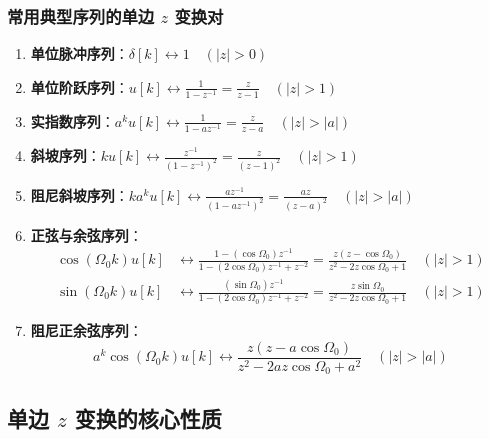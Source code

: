 \documentclass[11pt,a4paper,fontset=fandol]{ctexart}
\theoremstyle{remark}
\begin{document}
\subsubsection{常用典型序列的单边 $z$ 变换对}
\begin{enumerate}
    \item \textbf{单位脉冲序列}：$\delta[k] \longleftrightarrow 1 \quad (|z| > 0)$
    \item \textbf{单位阶跃序列}：$u[k] \longleftrightarrow \frac{1}{1 - z^{-1}} = \frac{z}{z - 1} \quad (|z| > 1)$
    \item \textbf{实指数序列}：$a^k u[k] \longleftrightarrow \frac{1}{1 - a z^{-1}} = \frac{z}{z - a} \quad (|z| > |a|)$
    \item \textbf{斜坡序列}：$k u[k] \longleftrightarrow \frac{z^{-1}}{(1 - z^{-1})^2} = \frac{z}{(z - 1)^2} \quad (|z| > 1)$
    \item \textbf{阻尼斜坡序列}：$k a^k u[k] \longleftrightarrow \frac{a z^{-1}}{(1 - a z^{-1})^2} = \frac{a z}{(z - a)^2} \quad (|z| > |a|)$
    \item \textbf{正弦与余弦序列}：
    \begin{align}
        \cos(\Omega_0 k)u[k] &\longleftrightarrow \frac{1 - (\cos\Omega_0)z^{-1}}{1 - (2\cos\Omega_0)z^{-1} + z^{-2}} = \frac{z(z - \cos\Omega_0)}{z^2 - 2z\cos\Omega_0 + 1} \quad (|z| > 1) \\
        \sin(\Omega_0 k)u[k] &\longleftrightarrow \frac{(\sin\Omega_0)z^{-1}}{1 - (2\cos\Omega_0)z^{-1} + z^{-2}} = \frac{z\sin\Omega_0}{z^2 - 2z\cos\Omega_0 + 1} \quad (|z| > 1)
    \end{align}
    \item \textbf{阻尼正余弦序列}：
    \begin{equation}
        a^k \cos(\Omega_0 k)u[k] \longleftrightarrow \frac{z(z - a\cos\Omega_0)}{z^2 - 2az\cos\Omega_0 + a^2} \quad (|z| > |a|)
    \end{equation}
\end{enumerate}

\subsection{单边 $z$ 变换的核心性质}
\end{document}
